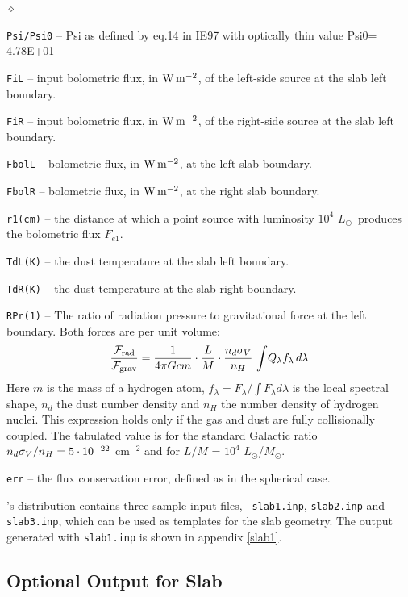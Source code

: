 \documentclass[11pt]{article}
\def\D    {{\sf DUSTY}}
\def\E#1{\hbox{$10^{#1}$}}
\def\eq#1{\begin{equation} #1 \end{equation}}
\def\Mo     {\hbox{$M_{\odot}$}}
\def\Lo     {\hbox{$L_{\odot}$}}
\def\sub#1{_{\rm #1}}
\def\Frad {\hbox{${\cal F}\sub{rad}$}}
\def\Fgrav{\hbox{${\cal F}\sub{grav}$}}
\begin{document}
\begin{list}{$\diamond$}{}
\item{\tt Psi/Psi0} -- Psi as defined by eq.14 in IE97 with optically
  thin value Psi0= 4.78E+01
\item{\tt FiL} -- input bolometric flux, in $\rm W\,m^{-2}$, of the
  left-side source at the slab left boundary.
\item{\tt FiR} -- input bolometric flux, in $\rm W\,m^{-2}$, of the
  right-side source at the slab left boundary.
\item{\tt FbolL} -- bolometric flux, in $\rm W\,m^{-2}$, at the left
  slab boundary.
\item{\tt FbolR} -- bolometric flux, in $\rm W\,m^{-2}$, at the right
  slab boundary.
\item{\tt r1(cm)} -- the distance at which a point source with
  luminosity \E4 \Lo\ produces the bolometric flux $F_{e1}$.
\item {\tt TdL(K)} -- the dust temperature at the slab left boundary.
\item {\tt TdR(K)} -- the dust temperature at the slab right boundary.
\item {\tt RPr(1)} -- The ratio of radiation pressure to gravitational force
    at the left boundary. Both forces are per unit volume:
  \eq{
      {\Frad\over\Fgrav} = {1\over4\pi Gcm} \cdot{L\over M}
      \cdot{n_d\sigma_V\over n_H}\, \int\!Q_\lambda f_\lambda\,d\lambda
     }
  Here $m$ is the mass of a hydrogen atom, $f_\lambda = F_\lambda/\int
  F_\lambda d\lambda$ is the local spectral shape, $n_d$ the dust number
  density and $n_H$ the number density of hydrogen nuclei.  This expression
  holds only if the gas and dust are fully collisionally coupled. The
  tabulated value is for the standard Galactic ratio $n_d\sigma_V/n_H =
  5\cdot\E{-22}$ cm$^{-2}$ and for $L/M$ = \E4 \Lo/\Mo.
\item{\tt err} -- the flux conservation error, defined as in the spherical
    case.

\end{list}

\bigskip \D's distribution contains three sample input files, {\tt
slab1.inp}, {\tt slab2.inp} and {\tt slab3.inp}, which can be used as
templates for the slab geometry. The output generated with {\tt slab1.inp} is
shown in appendix \ref{slab1}.

\subsection{Optional Output for Slab}
\label{sec:optional_slb}
\end{document}
